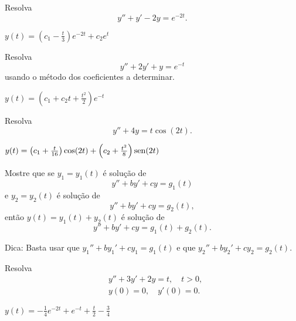 \begin{exer}
  Resolva
  \begin{equation}
    y'' + y' - 2y = e^{-2t}.
  \end{equation}
\end{exer}
\begin{resp}
  $y(t) = \left(c_1 - \frac{t}{3}\right)e^{-2t} + c_2e^t$
\end{resp}

\begin{exer}
  Resolva
  \begin{equation}
    y'' + 2y' + y = e^{-t}
  \end{equation}
  usando o método dos coeficientes a determinar.
\end{exer}
\begin{resp}
  $y(t) = \left(c_1 + c_2t + \frac{t^2}{2}\right)e^{-t}$
\end{resp}

\begin{exer}
  Resolva
  \begin{equation}
    y'' + 4y = t\cos(2t).
  \end{equation}
\end{exer}
\begin{resp}
  $y(t) = \left(c_1 + \frac{t}{16}\right)\cos(2t) + \left(c_2 + \frac{t^2}{8}\right)\operatorname{sen}(2t)$
\end{resp}

\begin{exer}
  Mostre que se $y_1 = y_1(t)$ é solução de
  \begin{equation}
    y'' + by' + cy = g_1(t)
  \end{equation}
  e $y_2 = y_2(t)$ é solução de
  \begin{equation}
    y'' + by' + cy = g_2(t),
  \end{equation}
  então $y(t) = y_1(t) + y_2(t)$ é solução de
  \begin{equation}
    y'' + by' + cy = g_1(t) + g_2(t).
  \end{equation}
\end{exer}
\begin{resp}
  Dica: Basta usar que $y_1''+by_1'+cy_1=g_1(t)$ e que $y_2''+by_2'+cy_2=g_2(t)$.
\end{resp}

\begin{exer}
  Resolva
  \begin{align}
    &y'' + 3y' + 2y = t,\quad t>0,\\
    &y(0)=0,\quad y'(0)=0.
  \end{align}
\end{exer}
\begin{resp}
  $y(t) = -\frac{1}{4}e^{-2t} + e^{-t} + \frac{t}{2} - \frac{3}{4}$
\end{resp}

